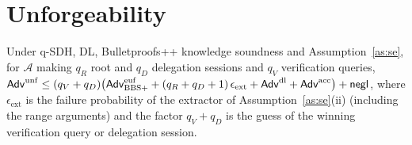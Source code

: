 \section{Unforgeability}\label{s:unf}
\begin{theorem}\label{th:unf}
Under q-SDH, DL, Bulletproofs++ knowledge soundness and Assumption~\ref{as:se}, for $\mathcal{A}$ making $q_R$ root and $q_D$ delegation sessions and $q_V$ verification queries,
$\mathsf{Adv}^{\mathrm{unf}}\le (q_V+q_D)\big(\mathsf{Adv}^{\mathrm{euf}}_{\mathrm{BBS+}}+(q_R+q_D+1)\,\epsilon_{\mathrm{ext}}+\mathsf{Adv}^{\mathrm{dl}}+\mathsf{Adv}^{\mathrm{acc}}\big)+\mathsf{negl}$, where $\epsilon_{\mathrm{ext}}$ is the failure probability of the extractor of Assumption~\ref{as:se}(ii) (including the range arguments) and the factor $q_V+q_D$ is the guess of the winning verification query or delegation session.
\end{theorem}
